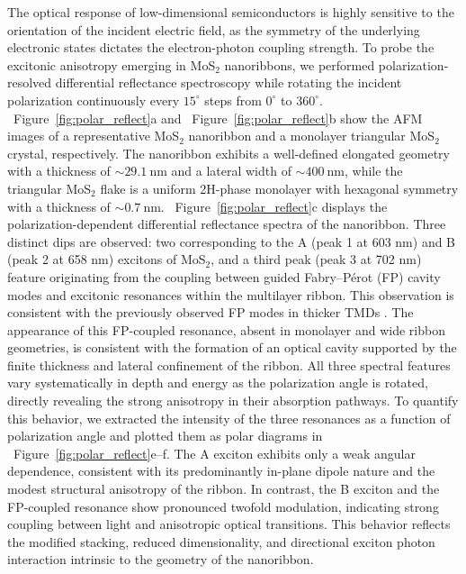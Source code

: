 \documentclass[journal=jacsnano,manuscript=article]{achemso}
\begin{document}
The optical response of low-dimensional semiconductors is highly sensitive to the 
orientation of the incident electric field, as the symmetry of the underlying electronic states dictates the electron-photon coupling strength. To probe the excitonic 
anisotropy emerging in  MoS$_2$ nanoribbons, we performed 
polarization-resolved differential reflectance spectroscopy while rotating the incident 
polarization continuously every $15^{\circ}$ steps from $0^{\circ}$ to $360^{\circ}$. ~Figure~\ref{fig:polar_reflect}a and ~Figure~\ref{fig:polar_reflect}b show the AFM 
images of a representative MoS$_2$ nanoribbon and a monolayer triangular MoS$_2$ crystal, 
respectively. The nanoribbon exhibits a well-defined elongated geometry with a thickness of 
$\sim 29.1~\text{nm}$ and a lateral width of $\sim 400~\text{nm}$, while the triangular MoS$_2$ 
flake is a uniform 2H-phase monolayer with hexagonal symmetry with a thickness of $\sim 0.7~\text{nm}$. ~Figure~\ref{fig:polar_reflect}c displays the polarization-dependent differential reflectance spectra of the nanoribbon. Three distinct dips are observed: two corresponding to the A (peak 1 at 603 nm) and B (peak 2 at 658 nm) excitons of MoS$_2$, and a third peak (peak 3 at 702 nm) feature originating from the coupling between guided Fabry–Pérot (FP) cavity modes and excitonic resonances within the multilayer ribbon. This observation is consistent with the previously observed FP modes in thicker TMDs \cite{BattulgaacsPhotonics}. The appearance of this FP-coupled resonance, absent in monolayer and wide ribbon geometries, is consistent with the formation of an optical cavity supported by the finite thickness and lateral confinement of the  ribbon. All three spectral features vary 
systematically in depth and energy as the polarization angle is rotated, directly revealing 
the strong anisotropy in their absorption pathways. To quantify this behavior, we extracted the intensity of the three resonances as a function 
of polarization angle and plotted them as polar diagrams in ~Figure~\ref{fig:polar_reflect}e–f. The A exciton exhibits only a weak angular dependence, consistent with its predominantly in-plane dipole nature and the modest structural anisotropy of the ribbon. In contrast, the B exciton and the FP-coupled resonance show pronounced twofold modulation, indicating strong coupling between light and anisotropic optical transitions. This behavior reflects the modified 
stacking, reduced dimensionality, and directional exciton photon interaction intrinsic to 
the  geometry of the nanoribbon.
\end{document}
